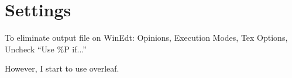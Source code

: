 \documentclass[a4paper]{article}
\begin{document}
\section{Settings}
To eliminate output file on WinEdt:
Opinions, Execution Modes, Tex Options, Uncheck ``Use \%P if...''

\noindent However, I start to use overleaf. 


%
\end{document}
